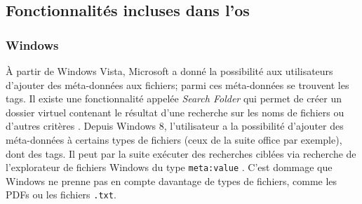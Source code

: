 \documentclass[a4paper, 12pt]{article}
\begin{document}
\subsection{Fonctionnalités incluses dans l'\acrshort{os}}

\subsubsection{Windows}
À partir de Windows Vista, Microsoft a donné la possibilité aux utilisateurs d'ajouter des 
méta-données aux fichiers; parmi ces méta-données se trouvent les tags. Il existe une fonctionnalité 
appelée \textit{Search Folder} qui permet de créer un dossier virtuel contenant le résultat d'une 
recherche sur les noms de fichiers ou d'autres critères \cite{ref19}. Depuis Windows 8, l'utilisateur 
a la possibilité d'ajouter des méta-données à certains types de fichiers (ceux de la suite office 
par exemple), dont des tags. Il peut par la suite exécuter des recherches ciblées via recherche de 
l'explorateur de fichiers Windows du type \texttt{meta:value} \cite{ref20}. C'est 
dommage que Windows ne prenne pas en compte davantage de types de fichiers, comme les PDFs ou les 
fichiers \texttt{.txt}.
\end{document}
